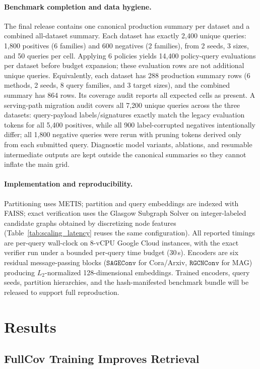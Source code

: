 \documentclass[runningheads]{llncs}
\begin{document}
\paragraph{Benchmark completion and data hygiene.}
The final release contains one canonical production summary per dataset and a combined all-dataset summary. Each dataset has exactly 2,400 unique queries: 1,800 positives (6 families) and 600 negatives (2 families), from 2 seeds, 3 sizes, and 50 queries per cell. Applying 6 policies yields 14,400 policy-query evaluations per dataset before budget expansion; these evaluation rows are not additional unique queries. Equivalently, each dataset has 288 production summary rows (6 methods, 2 seeds, 8 query families, and 3 target sizes), and the combined summary has 864 rows. Its coverage audit reports all expected cells as present. A serving-path migration audit covers all 7,200 unique queries across the three datasets: query-payload labels/signatures exactly match the legacy evaluation tokens for all 5,400 positives, while all 900 label-corrupted negatives intentionally differ; all 1,800 negative queries were rerun with pruning tokens derived only from each submitted query. Diagnostic model variants, ablations, and resumable intermediate outputs are kept outside the canonical summaries so they cannot inflate the main grid.

\paragraph{Implementation and reproducibility.} Partitioning uses METIS; partition and query embeddings are indexed with FAISS; exact verification uses the Glasgow Subgraph Solver on integer-labeled candidate graphs obtained by discretizing node features (Table~\ref{tab:scaling_latency} reuses the same configuration). All reported timings are per-query wall-clock on 8-vCPU Google Cloud instances, with the exact verifier run under a bounded per-query time budget (30\,s). Encoders are six residual message-passing blocks ($\mathtt{SAGEConv}$ for Cora/Arxiv, $\mathtt{RGCNConv}$ for MAG) producing $L_2$-normalized 128-dimensional embeddings. Trained encoders, query seeds, partition hierarchies, and the hash-manifested benchmark bundle will be released to support full reproduction.

\section{Results}

\subsection{FullCov Training Improves Retrieval}
\end{document}

